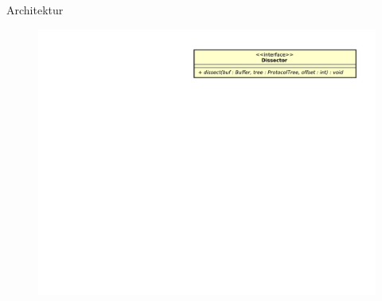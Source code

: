 \begin{frame}{Architektur}
    \begin{figure}
    	\centering
    	\includegraphics[width=\textwidth]{./images/dissector/1.pdf}
    \end{figure}
\end{frame}
